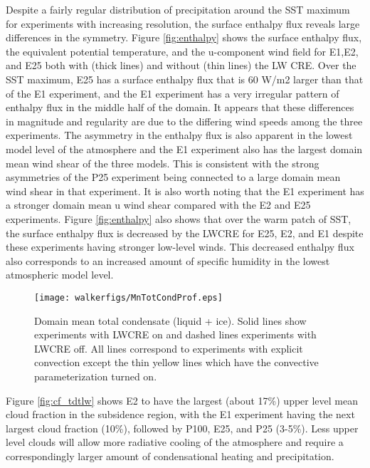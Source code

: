 \documentclass[11pt]{article}   	%
\begin{document}
Despite a fairly regular distribution of precipitation around the SST maximum for experiments with increasing resolution, the 
surface enthalpy flux reveals large differences in the symmetry.   Figure \ref{fig:enthalpy} shows the surface enthalpy flux, 
the equivalent potential temperature, and the u-component wind field for E1,E2, and E25 both with (thick lines) and 
without (thin lines) the LW CRE.  
Over the SST maximum, E25 has a surface enthalpy flux that is 
60 W/m2 larger than that of the E1 experiment, and the E1 experiment has a very irregular pattern of enthalpy flux in the middle
half of the domain.  It appears that these differences in magnitude and regularity are due to the differing wind speeds among 
the three experiments.  The asymmetry in the enthalpy flux is also apparent in the lowest model level of the atmosphere
and the E1 experiment also has the largest domain mean wind shear of the three models.  This is consistent with the 
strong asymmetries of the P25 experiment being connected to a large domain mean wind shear in that experiment.  
It is also worth noting that the E1 experiment has a stronger domain mean u wind shear compared 
with the E2 and E25 experiments.  Figure \ref{fig:enthalpy} also shows that over the warm patch of SST, the surface 
enthalpy flux is decreased by the LWCRE for E25, E2, and E1 despite these experiments having stronger low-level winds.  
This decreased enthalpy flux also corresponds to an increased amount of specific humidity in the lowest atmospheric 
model level.        


\begin{figure}
  \centering
      \texttt{[image: walkerfigs/MnTotCondProf.eps]}
          \caption{Domain mean total condensate (liquid + ice).  Solid lines show experiments with LWCRE on
          and dashed lines experiments with LWCRE off.  All lines correspond to experiments with explicit 
          convection except the thin yellow lines which have the convective parameterization turned on.}
  \label{fig:TotCond}
\end{figure}

Figure \ref{fig:cf_tdtlw} shows E2 to have the largest (about 17\%) upper level mean cloud
fraction in the subsidence region, with the E1 experiment having the next largest cloud fraction (10\%), followed by 
P100, E25, and P25 (3-5\%).   Less upper level clouds will allow more radiative cooling of the atmosphere and 
require a correspondingly larger amount of condensational heating and precipitation.    
\end{document}
